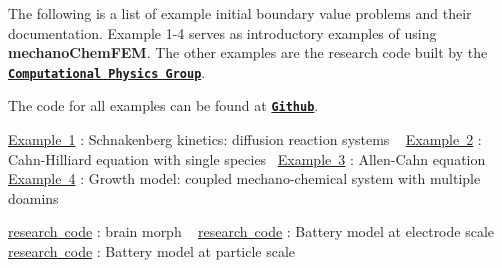 The following is a list of example initial boundary value problems and their documentation. Example 1-\/4 serves as introductory examples of using {\bfseries{mechano\+Chem\+F\+EM}}. The other examples are the research code built by the \href{http://umich.edu/~compphys/index.html}{\texttt{ {\bfseries{Computational Physics Group}}}}.

The code for all examples can be found at \href{https://github.com/mechanoChem/mechanoChemFEM/tree/example}{\texttt{ {\bfseries{Github}}}}.

\mbox{\hyperlink{diffusion_reaction}{Example 1}} \+: Schnakenberg kinetics\+: diffusion reaction systems ~\newline
 \mbox{\hyperlink{_cahn_hilliard}{Example 2}} \+: Cahn-\/\+Hilliard equation with single species~\newline
 \mbox{\hyperlink{_allen__cahn}{Example 3}} \+: Allen-\/\+Cahn equation ~\newline
 \mbox{\hyperlink{growth}{Example 4}} \+: Growth model\+: coupled mechano-\/chemical system with multiple doamins~\newline
 



\mbox{\hyperlink{brain_morph}{research code}} \+: brain morph ~\newline
 \mbox{\hyperlink{battery_electrode_scale}{research code}} \+: Battery model at electrode scale~\newline
 \mbox{\hyperlink{battery_particle}{research code}} \+: Battery model at particle scale~\newline
